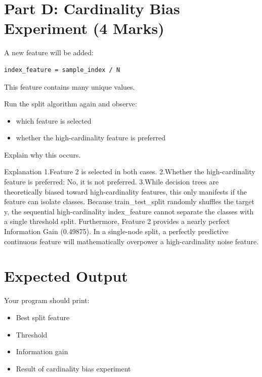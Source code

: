 \documentclass[12pt,a4paper]{article}
\begin{document}

\section{Part D: Cardinality Bias Experiment (4 Marks)}

\begin{tcolorbox}

A new feature will be added:

\begin{verbatim}
index_feature = sample_index / N
\end{verbatim}

This feature contains many unique values.

Run the split algorithm again and observe:

\begin{itemize}
\item which feature is selected
\item whether the high-cardinality feature is preferred
\end{itemize}

Explain why this occurs.

Explanation
1.Feature 2 is selected in both cases.
2.Whether the high-cardinality feature is preferred: No, it is not preferred.
3.While decision trees are theoretically biased toward high-cardinality features, this only manifests if the feature can isolate classes. Because train_test_split randomly shuffles the target y, the sequential high-cardinality index_feature cannot separate the classes with a single threshold split. Furthermore, Feature 2 provides a nearly perfect Information Gain (0.49875). In a single-node split, a perfectly predictive continuous feature will mathematically overpower a high-cardinality noise feature.

\vspace{6cm}

\end{tcolorbox}

\section{Expected Output}

Your program should print:

\begin{itemize}
\item Best split feature
\item Threshold
\item Information gain
\item Result of cardinality bias experiment
\end{itemize}
\end{document}
